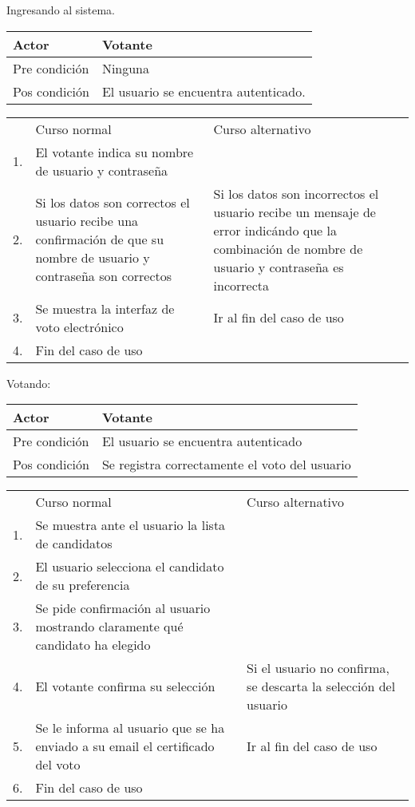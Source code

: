 

Ingresando al sistema.



\begin{tabular}{ll}
Actor & Votante \\
\hline
Pre condición & Ninguna \\
\hline
Pos condición & El usuario se encuentra autenticado. \\
\hline
\end{tabular}




\begin{tabular}{c p{4cm}|p{4cm}}
 & Curso normal & Curso alternativo \\
 1. & El votante indica su nombre de usuario y contraseña &  \\
 2. & Si los datos son correctos el usuario recibe una confirmación de que su nombre de usuario y contraseña son correctos & Si los datos son incorrectos el usuario recibe un mensaje de error indicándo que la combinación de nombre de usuario y contraseña es incorrecta \\
 3. & Se muestra la interfaz de voto electrónico & Ir al fin del caso de uso \\
4. & Fin del caso de uso& \\ 
\end{tabular}

\bigskip

Votando:


\begin{tabular}{ll}
Actor & Votante \\
\hline
Pre condición & El usuario se encuentra autenticado \\
\hline
Pos condición & Se registra correctamente el voto del usuario \\
\hline
\end{tabular}




\begin{tabular}{c p{4cm}|p{4cm}}
 & Curso normal & Curso alternativo \\
 1. & Se muestra ante el usuario la lista de candidatos &   \\
 2. & El usuario selecciona el candidato de su preferencia &   \\
 3. & Se pide confirmación al usuario mostrando claramente qué candidato ha elegido &   \\
 4. & El votante confirma su selección & Si el usuario no confirma, se descarta la selección del usuario  \\
 5. & Se le informa al usuario que se ha enviado a su e\-mail el certificado del voto & Ir al fin del caso de uso \\
 6. & Fin del caso de uso & \\
\end{tabular}


